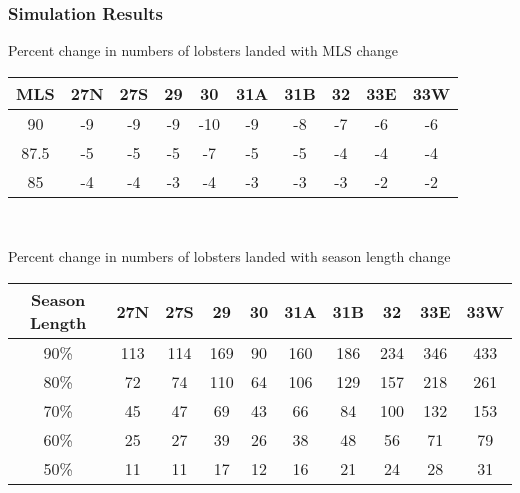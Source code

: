 \documentclass{beamer}
\begin{document}
\begin{frame}
\frametitle{Simulation Results}
Percent change in numbers of lobsters landed with MLS change 
\centering
\begin{tabular}{|c|c|c|c|c|c|c|c|c|c|}
\hline
MLS & 27N & 27S & 29 & 30 & 31A & 31B & 32 & 33E & 33W \\
\hline
90 & -9 & -9 & -9 & -10 & -9 & -8 & -7 & -6 & -6 \\
\hline
87.5 & -5 & -5 & -5 & -7  & -5 & -5 & -4 & -4 & -4 \\
\hline
85 & -4 & -4 & -3 & -4  & -3 & -3 & -3 & -2 & -2 \\
\hline
 
\end{tabular}\\
\vspace{5mm}

Percent change in numbers of lobsters landed with season length change 
\centering
\begin{tabular}{|c|c|c|c|c|c|c|c|c|c|}
\hline
Season Length & 27N & 27S & 29 & 30 & 31A & 31B & 32 & 33E & 33W \\
\hline
90\% & 113 & 114 & 169 & 90 & 160 & 186 & 234 & 346 & 433 \\
\hline
80\% & 72  & 74  & 110 & 64 & 106 & 129 & 157 & 218 & 261 \\
\hline
70\% & 45  & 47  & 69  & 43 & 66  & 84  & 100 & 132 & 153 \\
\hline
60\% & 25  & 27  & 39  & 26 & 38  & 48  & 56  & 71  & 79  \\
\hline
50\% & 11  & 11  & 17  & 12 & 16  & 21  & 24  & 28  & 31  \\
\hline
 
\end{tabular}
\end{frame}
\end{document}
